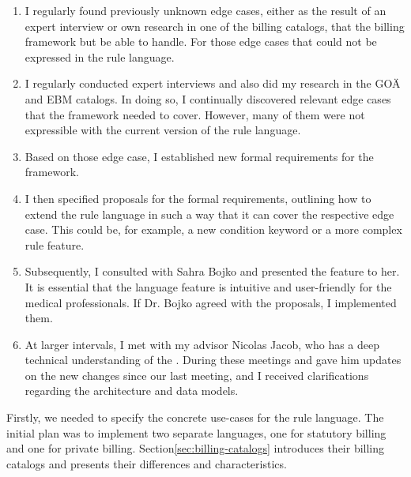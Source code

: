 \begin{enumerate}
    \item I regularly found previously unknown edge cases, either as the result of an expert interview or own research in one of the billing catalogs, that the billing framework but be able to handle.
    For those edge cases that could not be expressed in the rule language.
    \item I regularly conducted expert interviews and also did my research in the GOÄ and EBM catalogs.
    In doing so, I continually discovered relevant edge cases that the framework needed to cover.
    However, many of them were not expressible with the current version of the rule language.
    \item Based on those edge case, I established new formal requirements for the framework.
    \item I then specified proposals for the formal requirements, outlining how to extend the rule language in such a way that it can cover the respective edge case.
    This could be, for example, a new condition keyword or a more complex rule feature.
    \item Subsequently, I consulted with Sahra Bojko and presented the feature to her.
    It is essential that the language feature is intuitive and user-friendly for the medical professionals.
    If Dr. Bojko agreed with the proposals, I implemented them.
    \item At larger intervals, I met with my advisor Nicolas Jacob, who has a deep technical understanding of the \AVS.
    During these meetings and gave him updates on the new changes since our last meeting, and I received clarifications regarding the \AV architecture and data models.
\end{enumerate}

Firstly, we needed to specify the concrete use-cases for the rule language.
The initial plan was to implement two separate languages, one for statutory billing and one for private billing.
Section\ref{sec:billing-catalogs} introduces their billing catalogs and presents their differences and characteristics.

